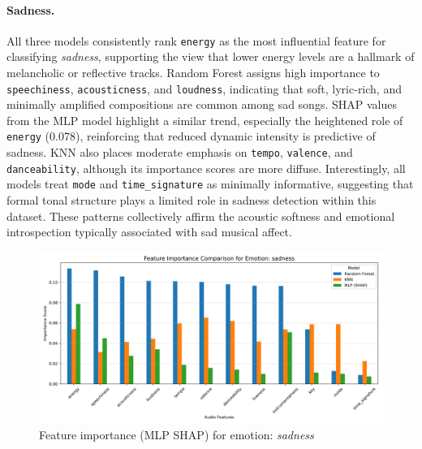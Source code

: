 \documentclass{article}
\begin{document}
\paragraph{Sadness.} All three models consistently rank \texttt{energy} as the most influential feature for classifying \textit{sadness}, supporting the view that lower energy levels are a hallmark of melancholic or reflective tracks. Random Forest assigns high importance to \texttt{speechiness}, \texttt{acousticness}, and \texttt{loudness}, indicating that soft, lyric-rich, and minimally amplified compositions are common among sad songs. SHAP values from the MLP model highlight a similar trend, especially the heightened role of \texttt{energy} (0.078), reinforcing that reduced dynamic intensity is predictive of sadness. KNN also places moderate emphasis on \texttt{tempo}, \texttt{valence}, and \texttt{danceability}, although its importance scores are more diffuse. Interestingly, all models treat \texttt{mode} and \texttt{time\_signature} as minimally informative, suggesting that formal tonal structure plays a limited role in sadness detection within this dataset. These patterns collectively affirm the acoustic softness and emotional introspection typically associated with sad musical affect.

\begin{figure}[H]
\centering
\includegraphics[width=\linewidth]{Graphics/per_label/sadness_feature_importance.png}
\caption{Feature importance (MLP SHAP) for emotion: \textit{sadness}}
\label{fig:shap_sadness}
\end{figure}
\end{document}
